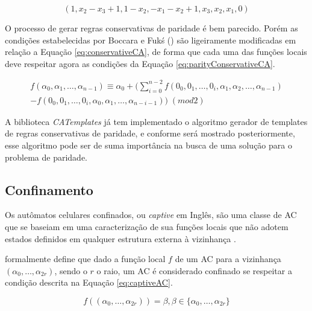 \documentclass[12pt,a4paper]{article}
\begin{document}
	\begin{equation}
	(1,x_2-x_3+1,1-x_2,-x_1-x_2+1,x_3,x_2,x_1,0)
	\label{eq:conservativeTemplate}
	\end{equation}

	O processo de gerar regras conservativas de paridade é bem parecido. Porém as condições estabelecidas por Boccara e Fukś (\citeyear{boccara2002}) são ligeiramente modificadas em relação a Equação \ref{eq:conservativeCA}, de forma que cada uma das funções locais deve respeitar agora as condições da Equação \ref{eq:parityConservativeCA}.

	\begin{equation}
	\begin{split}
	f(\alpha_0,\alpha_1, \dots,\alpha_{n-1}) \equiv \alpha_0 + (\sum_{i=0}^{n-2}f(0_0,0_1, \dots,0_i,\alpha_1,\alpha_2, \dots,\alpha_{n-1}) \\- f(0_0,0_1, \dots,0_i,\alpha_0,\alpha_1, \dots,\alpha_{n-i-1})) \; (mod 2)  
	\label{eq:parityConservativeCA}
	\end{split}
	\end{equation}

	A biblioteca \textit{CATemplates} já tem implementado o algoritmo gerador de templates de regras conservativas de paridade, e conforme será mostrado posteriormente, esse algoritmo pode ser de suma importância na busca de uma solução para o problema de paridade.





	\subsection{Confinamento}
	Os autômatos celulares confinados, ou \textit{captive} em Inglês, são uma classe de AC que se baseiam em uma caracterização de sua funções locais que não adotem estados definidos em qualquer estrutura externa à vizinhança \cite{theyssier2004captive}. 

	 formalmente define que dado a função local $f$ de um AC para a vizinhança $(\alpha_0, \dots, \alpha_{2r})$, sendo o $r$ o raio, um AC é considerado confinado se respeitar a condição descrita na Equação \ref{eq:captiveAC}.

	\begin{equation}
	f((\alpha_0, \dots, \alpha_{2r})) = \beta, \beta \in \{\alpha_0, \dots, \alpha_{2r}\}
	\label{eq:captiveAC}
	\end{equation}
\end{document}
